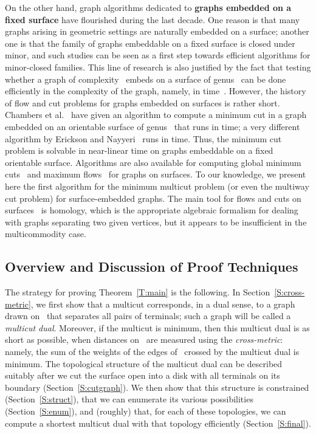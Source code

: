 \documentclass[11pt]{article}
\theoremstyle{plain}  \newtheorem{theorem}{Theorem}[section]
\theoremstyle{definition}
\begin{document}
On the other hand, graph algorithms dedicated to \textbf{graphs embedded on
  a fixed surface} have flourished during the last decade.  One reason is
that many graphs arising in geometric settings are naturally embedded on a
surface; another one is that the family of graphs embeddable on a fixed
surface is closed under minor, and such studies can be seen as a first step
towards efficient algorithms for minor-closed families.  This line of
research is also justified by the fact that testing whether a graph of
complexity~ embeds on a surface of genus~ can be done efficiently in
the complexity of the graph, namely, in  time~\cite{m-ltaeg-99}.
However, the history of flow and cut problems for graphs embedded
on surfaces is rather short.  Chambers et al.~\cite{cen-mcshc-09} have
given an algorithm to compute a minimum cut in a graph embedded on an
orientable surface of genus~ that runs in  time; a very
different algorithm by Erickson and Nayyeri~\cite{en-mcsnc-11} runs in
 time.  Thus, the minimum cut problem is solvable in
near-linear time on graphs embeddable on a fixed orientable surface.
Algorithms are also available for computing global minimum
cuts~\cite{efn-gmcse-12} and maximum flows~\cite{cen-hfcc-12} for graphs on
surfaces.  To our knowledge, we present here the first algorithm for the
minimum multicut problem (or even the multiway cut problem) for
surface-embedded graphs.  The main tool for flows and cuts on
surfaces~\cite{cen-hfcc-12,cen-mcshc-09,en-mcsnc-11,efn-gmcse-12} is
homology, which is the appropriate algebraic formalism for dealing with
graphs separating two given vertices, but it appears to be insufficient in
the multicommodity case.

\subsection*{Overview and Discussion of Proof Techniques}

The strategy for proving Theorem~\ref{T:main} is the following.  In
Section~\ref{S:cross-metric}, we first show that a multicut corresponds, in
a dual sense, to a graph drawn on~ that separates all pairs of
terminals; such a graph will be called a \emph{multicut dual}.  Moreover,
if the multicut is minimum, then this multicut dual is as short as
possible, when distances on~ are measured using the \emph{cross-metric}:
namely, the sum of the weights of the edges of~ crossed by the multicut
dual is minimum.  The topological structure of the multicut dual can be
described suitably after we cut the surface open into a disk with all
terminals on its boundary (Section~\ref{S:cutgraph}).  We then show that
this structure is constrained (Section~\ref{S:struct}), that we can
enumerate its various possibilities (Section~\ref{S:enum}), and (roughly)
that, for each of these topologies, we can compute a shortest multicut dual
with that topology efficiently (Section~\ref{S:final}).
\end{document}
